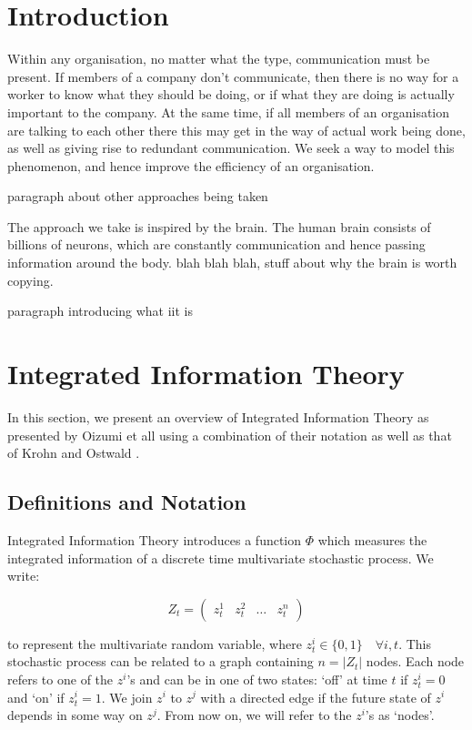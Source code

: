 


\section{Introduction}
Within any organisation, no matter what the type, communication must be present. If members of a company don't communicate, then there is no way for a worker to know what they should be doing, or if what they are doing is actually important to the company. At the same time, if all members of an organisation are talking to each other there this may get in the way of actual work being done, as well as giving rise to redundant communication. We seek a way to model this phenomenon, and hence improve the efficiency of an organisation.

paragraph about other approaches being taken

The approach we take is inspired by the brain. The human brain consists of billions of neurons, which are constantly communication and hence passing information around the body. blah blah blah, stuff about why the brain is worth copying.

paragraph introducing what iit is


\section{Integrated Information Theory}
\label{sec:iit}

In this section, we present an overview of Integrated Information Theory as presented by Oizumi et all \cite{oizumi2014phenomenology} using a combination of their notation as well as that of Krohn and Ostwald \cite{krohn2016computing}.

\subsection{Definitions and Notation}

Integrated Information Theory introduces a function $\Phi$ which measures the integrated information of a discrete time multivariate stochastic process. We write:

\begin{equation}
\label{def:1}
Z_t = \left(\begin{array}{cccc} z^1_t&z^2_t&\ldots&z^n_t\end{array}\right)
\end{equation}

to represent the multivariate random variable, where $z^i_t \in \{0,1\} \quad\forall i, t$. This stochastic process can be related to a graph containing $n = |Z_t|$ nodes. Each node refers to one of the $z^i$'s and can be in one of two states: `off' at time $t$ if $z^i_t=0$ and `on' if $z^i_t = 1$. We join $z^i$ to $z^j$ with a directed edge if the future state of $z^i$ depends in some way on $z^j$. From now on, we will refer to the $z^i$'s as `nodes'.

